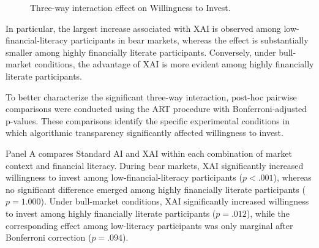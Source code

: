 \documentclass[10pt, a4paper]{article} %
\begin{document}

\begin{figure}[htpb]
\centering
{}
\caption{Three-way interaction effect on Willingness to Invest.}
\label{fig:interaction}
\end{figure}


In particular, the largest increase associated with XAI is observed among low-financial-literacy participants in bear markets, whereas the effect is substantially smaller among highly financially literate participants. Conversely, under bull-market conditions, the advantage of XAI is more evident among highly financially literate participants.

To better characterize the significant three-way interaction, post-hoc pairwise comparisons were conducted using the ART procedure with Bonferroni-adjusted p-values. These comparisons identify the specific experimental conditions in which algorithmic transparency significantly affected willingness to invest.

Panel A compares Standard AI and XAI within each combination of market context and financial literacy. During bear markets, XAI significantly increased willingness to invest among low-financial-literacy participants ($p<.001$), whereas no significant difference emerged among highly financially literate participants ($p=1.000$). Under bull-market conditions, XAI significantly increased willingness to invest among highly financially literate participants ($p=.012$), while the corresponding effect among low-literacy participants was only marginal after Bonferroni correction ($p=.094$).
\end{document}
